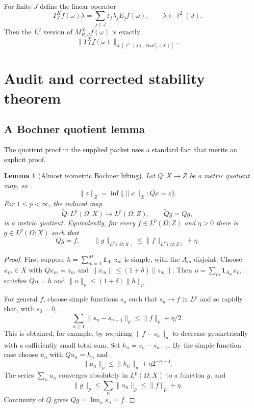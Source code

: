 \documentclass[11pt]{article}
\newtheorem{lemma}[theorem]{Lemma}
\theoremstyle{definition}
\newcommand{\Rad}{\operatorname{Rad}}
\newcommand{\cL}{\mathcal L}
\newcommand{\1}{\mathbf 1}
\newcommand{\eps}{\varepsilon}
\begin{document}
For finite $J$ define the linear operator
\begin{equation}\label{eq:TJ}
 T_J^Xf(\omega)\lambda
 =\sum_{j\in J}\eps_j\lambda_jE_jf(\omega),
 \qquad \lambda\in\ell^2(J).
\end{equation}
Then the $L^2$ version of $M_{R,J}^Xf(\omega)$ is exactly
\[
 \|T_J^Xf(\omega)\|_{\cL(\ell^2(J),\Rad_J^2(X))}.
\]

\section{Audit and corrected stability theorem}

\subsection{A Bochner quotient lemma}

The quotient proof in the supplied packet uses a standard fact that merits an
explicit proof.

\begin{lemma}[Almost isometric Bochner lifting]\label{lem:bochner-lift}
Let $Q:X\to Z$ be a metric quotient map, so
\[
 \|z\|_Z=\inf\{\|x\|_X:Qx=z\}.
\]
For $1\le p<\infty$, the induced map
\[
 \widetilde Q:L^p(\Omega;X)\longrightarrow L^p(\Omega;Z),
 \qquad \widetilde Qg=Qg,
\]
is a metric quotient.  Equivalently, for every $f\in L^p(\Omega;Z)$ and
$\eta>0$ there is $g\in L^p(\Omega;X)$ such that
\[
 Qg=f,\qquad \|g\|_{L^p(\Omega;X)}\le \|f\|_{L^p(\Omega;Z)}+\eta.
\]
\end{lemma}

\begin{proof}
First suppose $h=\sum_{m=1}^M\1_{A_m}z_m$ is simple, with the $A_m$ disjoint.
Choose $x_m\in X$ with $Qx_m=z_m$ and
$\|x_m\|\le(1+\delta)\|z_m\|$.  Then
$u=\sum_m\1_{A_m}x_m$ satisfies $Qu=h$ and
$\|u\|_p\le(1+\delta)\|h\|_p$.

For general $f$, choose simple functions $s_n$ such that $s_n\to f$ in $L^p$
and so rapidly that, with $s_0=0$,
\[
 \sum_{n\ge1}\|s_n-s_{n-1}\|_p\le \|f\|_p+\eta/2.
\]
This is obtained, for example, by requiring
$\|f-s_n\|_p$ to decrease geometrically with a sufficiently small total sum.
Set $h_n=s_n-s_{n-1}$.  By the simple-function case choose $u_n$ with
$Qu_n=h_n$ and
\[
 \|u_n\|_p\le \|h_n\|_p+\eta 2^{-n-1}.
\]
The series $\sum_nu_n$ converges absolutely in $L^p(\Omega;X)$ to a function
$g$, and
\[
 \|g\|_p\le\sum_n\|u_n\|_p\le\|f\|_p+\eta.
\]
Continuity of $Q$ gives $Qg=\lim_ns_n=f$.
\end{proof}
\end{document}
